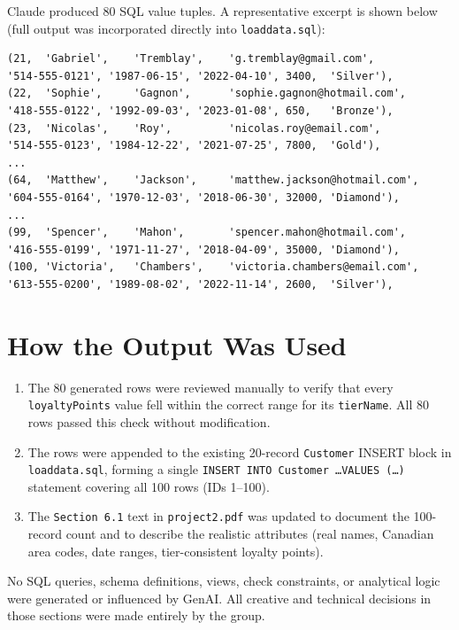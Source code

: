 \documentclass[12pt,letterpaper]{article}
\begin{document}
Claude produced 80 SQL value tuples. A representative excerpt is shown below (full output was incorporated directly into \texttt{loaddata.sql}):

\begin{lstlisting}[style=plaintext]
(21,  'Gabriel',    'Tremblay',    'g.tremblay@gmail.com',        '514-555-0121', '1987-06-15', '2022-04-10', 3400,  'Silver'),
(22,  'Sophie',     'Gagnon',      'sophie.gagnon@hotmail.com',   '418-555-0122', '1992-09-03', '2023-01-08', 650,   'Bronze'),
(23,  'Nicolas',    'Roy',         'nicolas.roy@email.com',       '514-555-0123', '1984-12-22', '2021-07-25', 7800,  'Gold'),
...
(64,  'Matthew',    'Jackson',     'matthew.jackson@hotmail.com', '604-555-0164', '1970-12-03', '2018-06-30', 32000, 'Diamond'),
...
(99,  'Spencer',    'Mahon',       'spencer.mahon@hotmail.com',   '416-555-0199', '1971-11-27', '2018-04-09', 35000, 'Diamond'),
(100, 'Victoria',   'Chambers',    'victoria.chambers@email.com', '613-555-0200', '1989-08-02', '2022-11-14', 2600,  'Silver'),
\end{lstlisting}

\section*{How the Output Was Used}

\begin{enumerate}
    \item The 80 generated rows were reviewed manually to verify that every \texttt{loyaltyPoints} value fell within the correct range for its \texttt{tierName}. All 80 rows passed this check without modification.

    \item The rows were appended to the existing 20-record \texttt{Customer} INSERT block in \texttt{loaddata.sql}, forming a single \texttt{INSERT INTO Customer \ldots VALUES (\ldots)} statement covering all 100 rows (IDs 1--100).

    \item The \texttt{Section 6.1} text in \texttt{project2.pdf} was updated to document the 100-record count and to describe the realistic attributes (real names, Canadian area codes, date ranges, tier-consistent loyalty points).
\end{enumerate}

\noindent No SQL queries, schema definitions, views, check constraints, or analytical logic were generated or influenced by GenAI. All creative and technical decisions in those sections were made entirely by the group.
\end{document}
